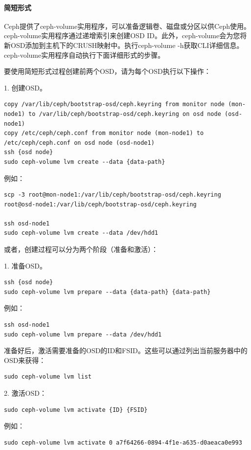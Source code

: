 \documentclass[12pt,UTF8]{ctexbook}
\begin{document}
\paragraph{简短形式}
Ceph提供了ceph-volume实用程序，可以准备逻辑卷、磁盘或分区以供Ceph使用。ceph-volume实用程序通过递增索引来创建OSD ID。此外，ceph-volume会为您将新OSD添加到主机下的CRUSH映射中。执行ceph-volume -h获取CLI详细信息。ceph-volume实用程序自动执行下面详细形式的步骤。

要使用简短形式过程创建前两个OSD，请为每个OSD执行以下操作：

1. 创建OSD。
\begin{verbatim}
copy /var/lib/ceph/bootstrap-osd/ceph.keyring from monitor node (mon-node1) to /var/lib/ceph/bootstrap-osd/ceph.keyring on osd node (osd-node1)
copy /etc/ceph/ceph.conf from monitor node (mon-node1) to /etc/ceph/ceph.conf on osd node (osd-node1)
ssh {osd node}
sudo ceph-volume lvm create --data {data-path}
\end{verbatim}

例如：
\begin{verbatim}
scp -3 root@mon-node1:/var/lib/ceph/bootstrap-osd/ceph.keyring root@osd-node1:/var/lib/ceph/bootstrap-osd/ceph.keyring

ssh osd-node1
sudo ceph-volume lvm create --data /dev/hdd1
\end{verbatim}

或者，创建过程可以分为两个阶段（准备和激活）：

1. 准备OSD。
\begin{verbatim}
ssh {osd node}
sudo ceph-volume lvm prepare --data {data-path} {data-path}
\end{verbatim}

例如：
\begin{verbatim}
ssh osd-node1
sudo ceph-volume lvm prepare --data /dev/hdd1
\end{verbatim}

准备好后，激活需要准备的OSD的ID和FSID。这些可以通过列出当前服务器中的OSD来获得：
\begin{verbatim}
sudo ceph-volume lvm list
\end{verbatim}

2. 激活OSD：
\begin{verbatim}
sudo ceph-volume lvm activate {ID} {FSID}
\end{verbatim}

例如：
\begin{verbatim}
sudo ceph-volume lvm activate 0 a7f64266-0894-4f1e-a635-d0aeaca0e993
\end{verbatim}
\end{document}
